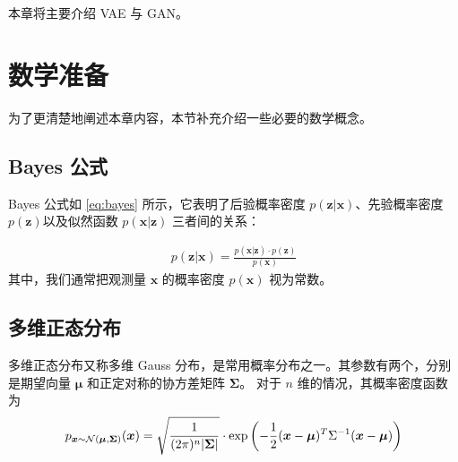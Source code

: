 本章将主要介绍 VAE 与 GAN。

\section{数学准备}
为了更清楚地阐述本章内容，本节补充介绍一些必要的数学概念。

\subsection{Bayes 公式}
Bayes 公式如 \eqref{eq:bayes} 所示，它表明了后验概率密度 $p(\bm z | \bm x)$、先验概率密度 $p(\bm z)$以及似然函数 $p(\bm x | \bm z)$ 三者间的关系：

\begin{align}
	p(\bm z | \bm x) = \frac{p(\bm x | \bm z) \cdot p(\bm z)}{p(\bm x)} \label{eq:bayes}
\end{align}
其中，我们通常把观测量 $\bm x$ 的概率密度 $p(\bm x)$ 视为常数。


\subsection{多维正态分布}
多维正态分布又称多维 Gauss 分布，是常用概率分布之一。其参数有两个，分别是期望向量 $\bm \mu$ 和正定对称的协方差矩阵 $\bm \Sigma$。
对于 $n$ 维的情况，其概率密度函数为
\begin{align}
	p_{\bm x \sim \mathcal{N}(\bm \mu, \bm \Sigma)}(\bm x) =
	\sqrt{\frac{1}{(2\pi)^n |\bm\Sigma|}} \cdot
	\exp \left(- \frac{1}{2} (\bm x - \bm \mu)^T \Sigma^{-1} (\bm x - \bm \mu)\right)
	\label{eq:normdist}
\end{align}

